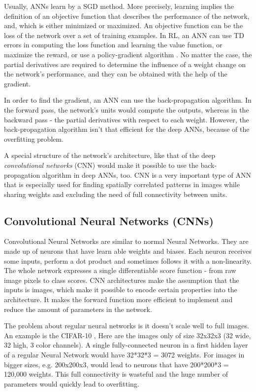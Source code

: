 Usually, ANNs learn by a SGD method. More precisely, learning implies the definition of an objective function that describes the performance of the network, and, which is either minimized or maximized. An objective function can be the loss of the network over a set of training examples. In RL, an ANN can use TD errors in computing the loss function and learning the value function, or maximize the reward, or use a policy-gradient algorithm \cite{Sutton}. No matter the case, the partial derivatives are required to determine the influence of a weight change on the network's performance, and they can be obtained with the help of the gradient.

In order to find the gradient, an ANN can use the back-propagation algorithm. In the forward pass, the network's units would compute the outputs, whereas in the backward pass - the partial derivatives with respect to each weight. However, the back-propagation algorithm isn't that efficient for the deep ANNs, because of the overfitting problem.

A special structure of the network's architecture, like that of the deep \textit{convolutional networks} (CNN) would make it possible to use the back-propagation algorithm in deep ANNs, too. CNN is a very important type of ANN that is especially used for finding spatially correlated patterns in images while sharing weights and excluding the need of full connectivity between units.

\subsection{Convolutional Neural Networks (CNNs)}

Convolutional Neural Networks are similar to normal Neural Networks. They are made up of neurons that have learn able weights and biases. Each neuron receives some inputs, perform a dot product and sometimes follows it with a non-linearity. The whole network expresses a single differentiable score function - from raw image pixels to class scores. CNN architectures make the assumption that the inputs is images, which make it possible to encode certain properties into the architecture. It makes the forward function more efficient to implement and reduce the amount of parameters in the network. \cite{CNN_course}      

The problem about regular neural networks is it doesn't scale well to full images. An example is the CIFAR-10 \cite{CIFAR_10}, Here are the images only of size 32x32x3 (32 wide, 32 high, 3 color channels). A single fully-connected neuron in a first hidden layer of a regular Neural Network would have 32*32*3 = 3072 weights. For images in bigger sizes, e.g. 200x200x3, would lead to neurons that have 200*200*3 = 120,000 weights. This full connectivity is wasteful and the huge number of parameters would quickly lead to overfitting.

